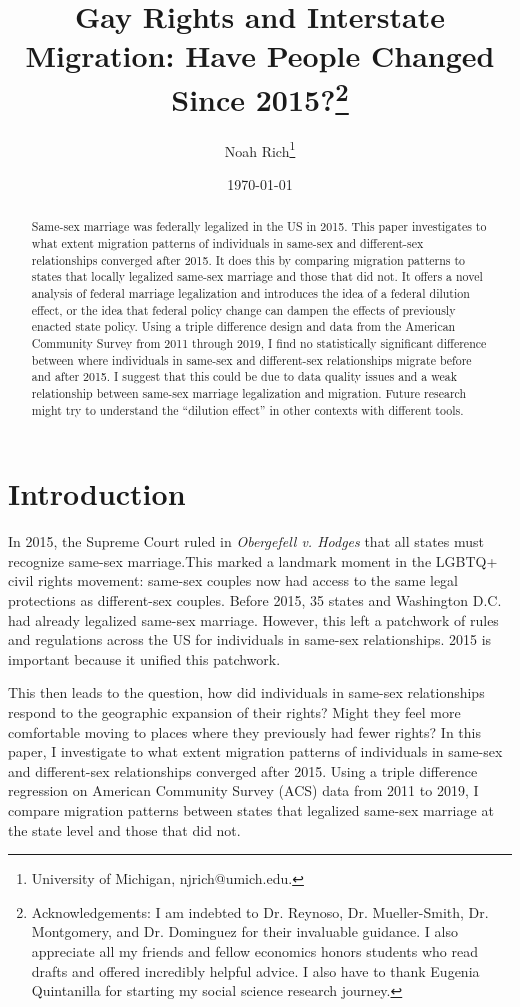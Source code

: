 \documentclass[12pt,letterpaper]{article}
\title{Gay Rights and Interstate Migration: Have People Changed Since 2015?\footnote{Acknowledgements: I am indebted to Dr. Reynoso, Dr. Mueller-Smith, Dr. Montgomery, and Dr. Dominguez for their invaluable guidance. I also appreciate all my friends and fellow economics honors students who read drafts and offered incredibly helpful advice. I also have to thank Eugenia Quintanilla for starting my social science research journey.}}
\author{Noah Rich\footnote{University of Michigan, njrich@umich.edu.}}
\date{\today}
\begin{document}
\doublespacing

\maketitle


\begin{abstract}
Same-sex marriage was federally legalized in the US in 2015. This paper investigates to what extent migration patterns of individuals in same-sex and different-sex relationships converged after 2015. It does this by comparing migration patterns to states that locally legalized same-sex marriage and those that did not. It offers a novel analysis of federal marriage legalization and introduces the idea of a federal dilution effect, or the idea that federal policy change can dampen the effects of previously enacted state policy. Using a triple difference design and data from the American Community Survey from 2011 through 2019, I find no statistically significant difference between where individuals in same-sex and different-sex relationships migrate before and after 2015. I suggest that this could be due to data quality issues and a weak relationship between same-sex marriage legalization and migration. Future research might try to understand the “dilution effect” in other contexts with different tools.
\end{abstract}

\newpage

\section{Introduction}

In 2015, the Supreme Court ruled in \textit{Obergefell v. Hodges} that all states must recognize same-sex marriage.This marked a landmark moment in the LGBTQ+ civil rights movement: same-sex couples now had access to the same legal protections as different-sex couples. Before 2015, 35 states and Washington D.C. had already legalized same-sex marriage. However, this left a patchwork of rules and regulations across the US for individuals in same-sex relationships. 2015 is important because it unified this patchwork.

This then leads to the question, how did individuals in same-sex relationships respond to the geographic expansion of their rights? Might they feel more comfortable moving to places where they previously had fewer rights? In this paper, I investigate to what extent migration patterns of individuals in same-sex and different-sex relationships converged after 2015. Using a triple difference regression on American Community Survey (ACS) data from 2011 to 2019, I compare migration patterns between states that legalized same-sex marriage at the state level and those that did not.
\end{document}
